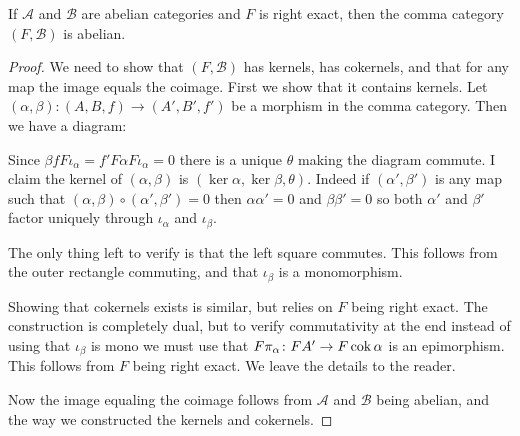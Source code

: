 \begin{prop}\label{prop:comma-cat_abelian}
	If $\mathcal A$ and $\mathcal B$ are abelian categories and $F$ is right exact, then the comma category $(F, \mathcal  B)$ is abelian.
	\begin{proof}
		We need to show that $(F, \mathcal B)$ has kernels, has cokernels, and that for any map the image equals the coimage. First we show that it contains kernels. Let $(\alpha, \beta)\colon(A, B, f) \to (A', B', f')$ be a morphism in the comma category. Then we have a diagram:
		\begin{center}
		\end{center}
		Since $\beta f F\iota_\alpha = f' F\alpha F \iota_\alpha = 0$ there is a unique $\theta$ making the diagram commute. I claim the kernel of $(\alpha, \beta)$ is $(\ker \alpha, \ker \beta, \theta)$. Indeed if $(\alpha', \beta')$ is any map such that $(\alpha, \beta) \circ (\alpha', \beta') = 0$ then $\alpha\alpha'=0$ and $\beta\beta'=0$ so both $\alpha'$ and $\beta'$ factor uniquely through $\iota_\alpha$ and $\iota_\beta$.
		\begin{center}
		\end{center}
		The only thing left to verify is that the left square commutes. This follows from the outer rectangle commuting, and that $\iota_\beta$ is a monomorphism.
		
		Showing that cokernels exists is similar, but relies on $F$ being right exact. The construction is completely dual, but to verify commutativity at the end instead of using that $\iota_\beta$ is mono we must use that $F\pi_\alpha\colon FA' \to F\operatorname{cok} \alpha$ is an epimorphism. This follows from $F$ being right exact. We leave the details to the reader. 
		
		Now the image equaling the coimage follows from $\mathcal A$ and $\mathcal B$ being abelian, and the way we constructed the kernels and cokernels.
	\end{proof}
\end{prop}

